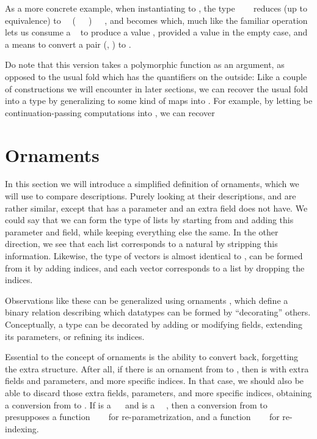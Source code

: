 As a more concrete example, when instantiating  to , the type \ \ \  reduces (up to equivalence) to \ \ (\ \ \ )\ \ \ , and  becomes
which, much like the familiar  operation lets us consume a \  to produce a value , provided a value  in the empty case, and a means to convert a pair (, ) to .

Do note that this version takes a polymorphic function as an argument, as opposed to the usual fold which has the quantifiers on the outside:
Like a couple of constructions we will encounter in later sections, we can recover the usual fold into a type  by generalizing  to some kind of maps into . For example, by letting  be continuation-passing computations into \bN{}, we can recover


\section{Ornaments}\label{sec:background-ornaments}
In this section we will introduce a simplified definition of ornaments, which we will use to compare descriptions. Purely looking at their descriptions, \bN{} and  are rather similar, except that  has a parameter and an extra field \bN{} does not have. We could say that we can form the type of lists by starting from \bN{} and adding this parameter and field, while keeping everything else the same. In the other direction, we see that each list corresponds to a natural by stripping this information. Likewise, the type of vectors is almost identical to , can be formed from it by adding indices, and each vector corresponds to a list by dropping the indices.

Observations like these can be generalized using ornaments \cite{algorn, progorn, sijsling}, which define a binary relation describing which datatypes can be formed by ``decorating'' others. Conceptually, a type can be decorated by adding or modifying fields, extending its parameters, or refining its indices.

Essential to the concept of ornaments is the ability to convert back, forgetting the extra structure. After all, if there is an ornament from  to , then  is  with extra fields and parameters, and more specific indices. In that case, we should also be able to discard those extra fields, parameters, and more specific indices, obtaining a conversion from  to . If  is a \ \  and  is a \ \ , then a conversion from  to  presupposes a function \ \ \  for re-parametrization, and a function \ \ \  for re-indexing.

